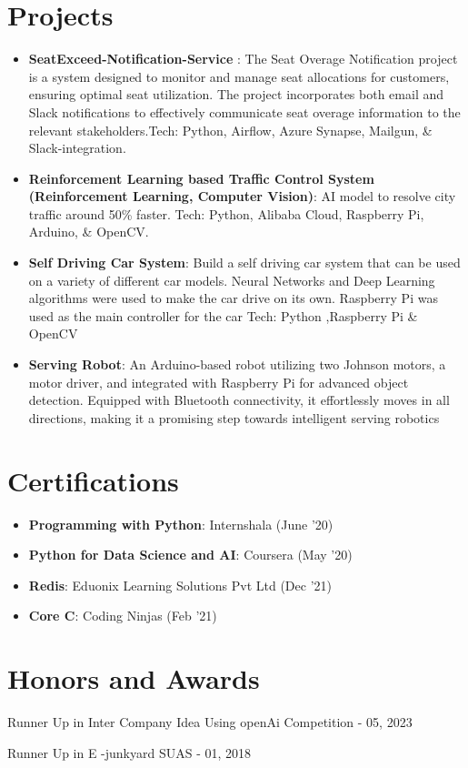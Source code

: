 \documentclass[a4paper,20pt]{article}
\newcommand{\resumeItem}[2]{
  \item\small{
    \textbf{#1}{: #2 \vspace{-2pt}}
  }
}
\newcommand{\resumeSubItem}[2]{\resumeItem{#1}{#2}\vspace{-3pt}}
\newcommand{\resumeSubHeadingListStart}{\begin{itemize}[leftmargin=*]}
\newcommand{\resumeSubHeadingListEnd}{\end{itemize}}
\begin{document}
\vspace{-5pt}
\section{Projects}
\resumeSubHeadingListStart
\resumeSubItem{SeatExceed-Notification-Service }{The Seat Overage Notification project is a system designed to monitor and manage seat allocations for customers, ensuring optimal seat utilization. The project incorporates both email and Slack notifications to effectively communicate seat overage information to the relevant stakeholders.Tech: Python, Airflow, Azure Synapse, Mailgun, & Slack-integration. }
\vspace{2pt}
\resumeSubItem{Reinforcement Learning based Traffic Control System (Reinforcement Learning, Computer Vision)}{AI model to resolve city traffic around 50\% faster. Tech: Python, Alibaba Cloud, Raspberry Pi, Arduino, & OpenCV. }
\vspace{2pt}
\resumeSubItem{Self Driving Car System}{Build a self driving car system that can be used on a variety of different car models. Neural Networks and Deep Learning algorithms were used to make
the car drive on its own. Raspberry Pi was used as the main controller for the
car Tech:  Python ,Raspberry Pi & OpenCV}
\vspace{2pt}
\resumeSubItem{Serving Robot}{An Arduino-based robot utilizing two Johnson motors, a motor driver, and integrated with Raspberry Pi for advanced object detection. Equipped with Bluetooth connectivity, it effortlessly moves in all directions, making it a promising step towards intelligent serving robotics }
\vspace{2pt}
\resumeSubHeadingListEnd
\vspace{-5pt}
\section{Certifications}
\resumeSubHeadingListStart
\resumeSubItem{Programming with Python}{Internshala  (June '20)}
\vspace{2pt}
\resumeSubItem{Python for Data Science and AI}{Coursera (May '20)}
\vspace{2pt}
\resumeSubItem{Redis}{Eduonix Learning Solutions Pvt Ltd (Dec '21) }
\vspace{2pt}
\resumeSubItem{Core C}{Coding Ninjas (Feb '21) }
\resumeSubHeadingListEnd
\vspace{-5pt}
\section{Honors and Awards}
\begin{description}[font=$\bullet$]
\item {Runner Up in Inter Company Idea  Using openAi Competition  - 05, 2023}
\vspace{-5pt}
\item { Runner Up in E -junkyard SUAS -  01, 2018 }
\vspace{-5pt}

\end{description}
\end{document}
